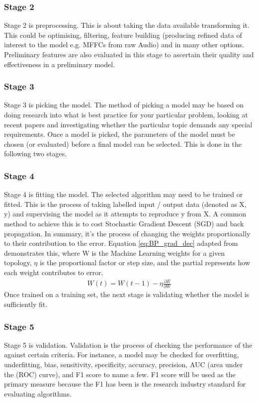 \documentclass{UoNMCHA}
\numberwithin{equation}{section}
\begin{document}
\subsubsection{Stage 2}
Stage 2 is preprocessing. This is about taking the data available transforming it. This could be optimising, filtering, feature building (producing refined data of interest to the model e.g. MFFCs from raw Audio) and in many other options. Preliminary features are also evaluated in this stage to ascertain their quality and effectiveness in a preliminary model.

\subsubsection{Stage 3}
Stage 3 is picking the model. The method of picking a model may be based on doing research into what is best practice for your particular problem, looking at recent papers and investigating whether the particular topic demands any special requirements. Once a model is picked, the parameters of the model must be chosen (or evaluated) before a final model can be selected. This is done in the following two stages.

\subsubsection{Stage 4}
Stage 4 is fitting the model. The selected algorithm may need to be trained or fitted. This is the process of taking labelled input / output data (denoted as X, y) and supervising the model as it attempts to reproduce y from X. A common method to achieve this is to cost Stochastic Gradient Descent (SGD) and back propagation\cite{lecun2012efficient}. In summary, it's the process of changing the weights proportionally to their contribution to the error. Equation \ref{eq:BP_grad_dec} adapted from \cite{lecun2012efficient} demonstrates this, where W is the Machine Learning weights for a given topology, $\eta$ is the proportional factor or step size, and the partial represents how each weight contributes to error.\\

\begin{gather}\label{eq:BP_grad_dec}
    W(t) = W(t-1) - \eta\frac{\partial E}{\partial W} 
\end{gather}
Once trained on a training set, the next stage is validating whether the model is sufficiently fit.

\subsubsection{Stage 5}
Stage 5 is validation. Validation is the process of checking the performance of the against certain criteria. For instance, a model may be checked for overfitting, underfitting, bias, sensitivity, specificity, accuracy, precision, AUC (area under the (ROC) curve), and F1 score to name a few. F1 score will be used as the primary measure because the F1 has been is the research industry standard for evaluating algorithms. \\
\end{document}

